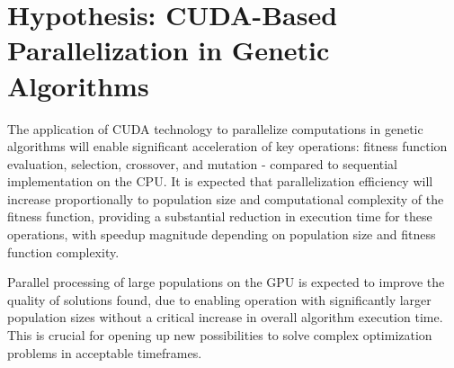 \documentclass[14pt,a4paper]{extarticle}
\begin{document}
\section*{Hypothesis: CUDA-Based Parallelization in Genetic Algorithms}

The application of CUDA technology to parallelize computations in genetic algorithms 
will enable significant acceleration of key operations: fitness function evaluation, 
selection, crossover, and mutation - compared to sequential implementation on the CPU. 
It is expected that parallelization efficiency will increase proportionally to population 
size and computational complexity of the fitness function, providing a substantial reduction in execution time for these operations, with speedup magnitude depending on population size and fitness function complexity.

\bigskip Parallel processing of large populations on the GPU is expected to improve the quality of 
solutions found, due to enabling operation with significantly larger population sizes without 
a critical increase in overall algorithm execution time. This is crucial for opening up new 
possibilities to solve complex optimization problems in acceptable timeframes.
\end{document}
